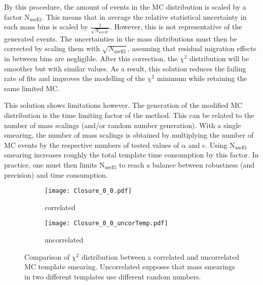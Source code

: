 By this procedure, the amount of events in the MC distribution is scaled by a factor N\(_{\text{useEl}}\).
This means that in average the relative statistical uncertainty in each mass bins is scaled by \(\frac{1}{\sqrt{N_{useEl}}}\).
However, this is not representative of the generated events.
The uncertainties in the mass distributions must then be corrected by scaling them with \(\sqrt{N_\text{useEl}}\), assuming that residual migration effects in between bins are negligible.
After this correction, the $\chi^2$ distribution will be smoother but with similar values.
As a result, this solution reduces the failing rate of fits and improves the modelling of the $\chi^2$ minimum while retaining the same limited MC.

This solution shows limitations however.
The generation of the modified MC distribution is the time limiting factor of the method.
This can be related to the number of mass scalings (and/or random number generation).
With a single smearing, the number of mass scalings is obtained by multiplying the number of MC events by the respective numbers of tested values of $\alpha$ and c.
Using N\(_{\text{useEl}}\) smearing increases roughly the total template time consumption by this factor.
In practice, one must then limits N\(_{\text{useEl}}\) to reach a balance between robustness (and precision) and time consumption.


\begin{figure}
\begin{subfigure}[t]{0.49\linewidth}
\begin{center}
\texttt{[image: Closure\_0\_0.pdf]}
\end{center}
\caption{correlated}
\end{subfigure}
\begin{subfigure}[t]{0.49\linewidth}
\begin{center}
\texttt{[image: Closure\_0\_0\_uncorTemp.pdf]}
\end{center}
\caption{uncorrelated}
\end{subfigure}
\caption{\label{orgff6a45b}
Comparison of $\chi^2$ distribution between a correlated and uncorrelated MC template smearing. Uncorrelated supposes that mass smearings in two different templates use different random numbers.}
\end{figure}



